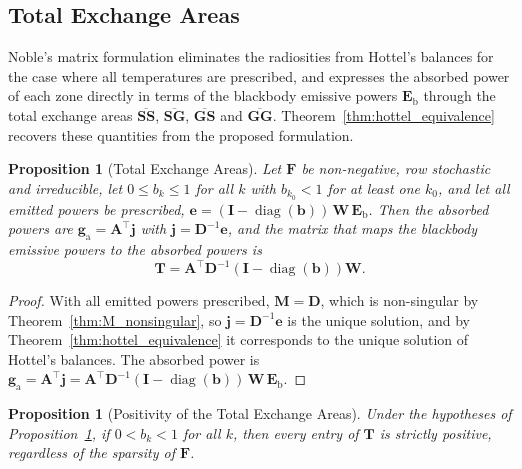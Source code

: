 \documentclass[preprint,1p,times]{elsarticle}
\theoremstyle{plain}
\newtheorem{proposition}[theorem]{Proposition}
\theoremstyle{definition}
\theoremstyle{remark}
\begin{document}
\subsection{Total Exchange Areas}
\label{sec:total_exchange_areas}

Noble's matrix formulation \citep{Noble1975} eliminates the radiosities from Hottel's balances for the case where all temperatures are prescribed, and expresses the absorbed power of each zone directly in terms of the blackbody emissive powers $\mathbf{E}_\mathrm{b}$ through the total exchange areas $\overline{\mathbf{SS}}$, $\overline{\mathbf{SG}}$, $\overline{\mathbf{GS}}$ and $\overline{\mathbf{GG}}$. Theorem~\ref{thm:hottel_equivalence} recovers these quantities from the proposed formulation.

\begin{proposition}[Total Exchange Areas]
\label{prop:total_exchange_areas}
Let $\mathbf{F}$ be non-negative, row stochastic and irreducible, let $0 \leq b_k \leq 1$ for all $k$ with $b_{k_0} < 1$ for at least one $k_0$, and let all emitted powers be prescribed, $\mathbf{e} = (\mathbf{I} - \operatorname{diag}(\mathbf{b}))\,\mathbf{W}\,\mathbf{E}_\mathrm{b}$. Then the absorbed powers are $\mathbf{g}_\mathrm{a} = \mathbf{A}^\top\mathbf{j}$ with $\mathbf{j} = \mathbf{D}^{-1}\mathbf{e}$, and the matrix that maps the blackbody emissive powers to the absorbed powers is
\begin{equation}
\mathbf{T} = \mathbf{A}^\top \mathbf{D}^{-1} \left(\mathbf{I} - \operatorname{diag}(\mathbf{b})\right) \mathbf{W} .
\label{eq:total_exchange_areas}
\end{equation}
\end{proposition}

\begin{proof}
With all emitted powers prescribed, $\mathbf{M} = \mathbf{D}$, which is non-singular by Theorem~\ref{thm:M_nonsingular}, so $\mathbf{j} = \mathbf{D}^{-1}\mathbf{e}$ is the unique solution, and by Theorem~\ref{thm:hottel_equivalence} it corresponds to the unique solution of Hottel's balances. The absorbed power is $\mathbf{g}_\mathrm{a} = \mathbf{A}^\top\mathbf{j} = \mathbf{A}^\top\mathbf{D}^{-1}(\mathbf{I} - \operatorname{diag}(\mathbf{b}))\,\mathbf{W}\,\mathbf{E}_\mathrm{b}$.
\end{proof}

\begin{proposition}[Positivity of the Total Exchange Areas]
\label{prop:total_exchange_positivity}
Under the hypotheses of Proposition~\ref{prop:total_exchange_areas}, if $0 < b_k < 1$ for all $k$, then every entry of $\mathbf{T}$ is strictly positive, regardless of the sparsity of $\mathbf{F}$.
\end{proposition}
\end{document}
